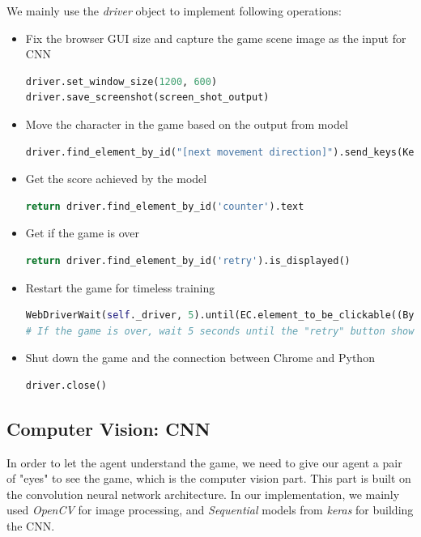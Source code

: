 \documentclass{article}
\begin{document}
We mainly use the \textit{driver} object to implement following operations:

\begin{itemize}
  \item Fix the browser GUI size and capture the game scene image as the input for CNN
  \begin{lstlisting}[language=Python]
driver.set_window_size(1200, 600)  
driver.save_screenshot(screen_shot_output)
    \end{lstlisting}
  \item Move the character in the game based on the output from model
  \begin{lstlisting}[language=Python]
driver.find_element_by_id("[next movement direction]").send_keys(Keys.[Direction])
    \end{lstlisting}
    \item Get the score achieved by the model
    \begin{lstlisting}[language=Python]
return driver.find_element_by_id('counter').text
    \end{lstlisting}
    \item Get if the game is over
    \begin{lstlisting}[language=Python]
return driver.find_element_by_id('retry').is_displayed()
    \end{lstlisting}
    \item Restart the game for timeless training
    \begin{lstlisting}[language=Python]
WebDriverWait(self._driver, 5).until(EC.element_to_be_clickable((By.ID, "retry"))).click()
# If the game is over, wait 5 seconds until the "retry" button shown up and available to be clicked
    \end{lstlisting}
    \item Shut down the game and the connection between Chrome and Python
    \begin{lstlisting}[language=Python]
driver.close()
    \end{lstlisting}
\end{itemize}



\subsection{Computer Vision: CNN}
In order to let the agent understand the game, we need to give our agent a pair of "eyes" to see the game, which is the computer vision part. This part is built on the convolution neural network architecture. In our implementation, we mainly used \textit{OpenCV} for image processing, and \textit{Sequential} models from \textit{keras} for building the CNN.
\end{document}
